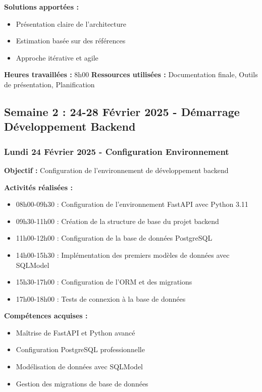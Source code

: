 \textbf{Solutions apportées :}
\begin{itemize}
    \item Présentation claire de l'architecture
    \item Estimation basée sur des références
    \item Approche itérative et agile
\end{itemize}

\textbf{Heures travaillées :} 8h00
\textbf{Ressources utilisées :} Documentation finale, Outils de présentation, Planification

\subsection{Semaine 2 : 24-28 Février 2025 - Démarrage Développement Backend}

\subsubsection{Lundi 24 Février 2025 - Configuration Environnement}
\textbf{Objectif :} Configuration de l'environnement de développement backend

\textbf{Activités réalisées :}
\begin{itemize}
    \item 08h00-09h30 : Configuration de l'environnement FastAPI avec Python 3.11
    \item 09h30-11h00 : Création de la structure de base du projet backend
    \item 11h00-12h00 : Configuration de la base de données PostgreSQL
    \item 14h00-15h30 : Implémentation des premiers modèles de données avec SQLModel
    \item 15h30-17h00 : Configuration de l'ORM et des migrations
    \item 17h00-18h00 : Tests de connexion à la base de données
\end{itemize}

\textbf{Compétences acquises :}
\begin{itemize}
    \item Maîtrise de FastAPI et Python avancé
    \item Configuration PostgreSQL professionnelle
    \item Modélisation de données avec SQLModel
    \item Gestion des migrations de base de données
\end{itemize}

